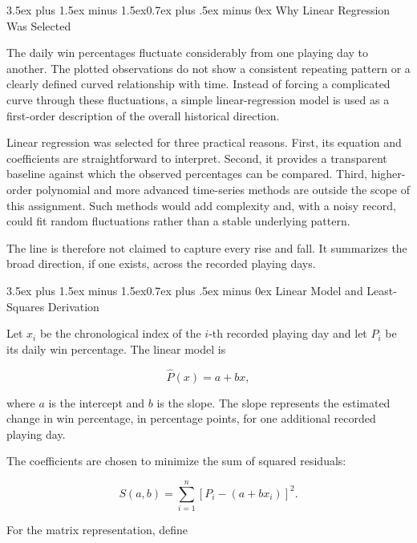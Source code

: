 \documentclass[journal]{IEEEtran}
\makeatletter
\renewcommand\subsection{\@startsection{subsection}{2}{\z@}%
  {3.5ex plus 1.5ex minus 1.5ex}{0.7ex plus .5ex minus 0ex}%
  {\normalfont\normalsize\bfseries\upshape\color{red}}}
\numberwithin{equation}{subsection}
\makeatother
\begin{document}
\subsection{Why Linear Regression Was Selected}

The daily win percentages fluctuate considerably from one
playing day to another. The plotted observations do not show
a consistent repeating pattern or a clearly defined curved
relationship with time. Instead of forcing a complicated
curve through these fluctuations, a simple linear-regression
model is used as a first-order description of the overall
historical direction.

Linear regression was selected for three practical reasons.
First, its equation and coefficients are straightforward to
interpret. Second, it provides a transparent baseline against
which the observed percentages can be compared. Third, higher-
order polynomial and more advanced time-series methods are
outside the scope of this assignment. Such methods would add
complexity and, with a noisy record, could fit random
fluctuations rather than a stable underlying pattern.

The line is therefore not claimed to capture every rise and
fall. It summarizes the broad direction, if one exists, across
the recorded playing days.

\subsection{Linear Model and Least-Squares Derivation}

Let \(x_i\) be the chronological index of the \(i\)-th
recorded playing day and let \(P_i\) be its daily win
percentage. The linear model is

\begin{equation}
\widehat{P}(x)=a+bx,
\label{eq:linear-model}
\end{equation}

where \(a\) is the intercept and \(b\) is the slope. The
slope represents the estimated change in win percentage, in
percentage points, for one additional recorded playing day.

The coefficients are chosen to minimize the sum of squared
residuals:

\begin{equation}
S(a,b)=\sum_{i=1}^{n}\left[P_i-(a+bx_i)\right]^2.
\label{eq:least-squares-objective}
\end{equation}

For the matrix representation, define
\end{document}

